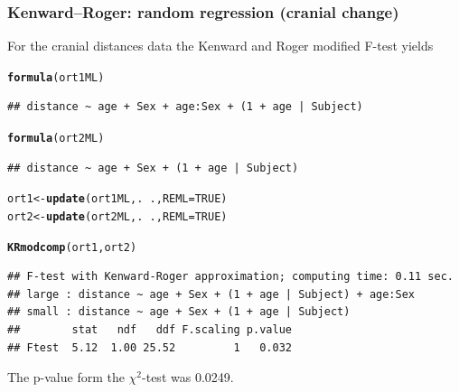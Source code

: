 \documentclass[compress]{beamer}\usepackage[]{graphicx}\usepackage[]{color}
\makeatletter
\newcommand{\hlnum}[1]{\textcolor[rgb]{0.686,0.059,0.569}{#1}}%
\newcommand{\hlopt}[1]{\textcolor[rgb]{0,0,0}{#1}}%
\newcommand{\hlstd}[1]{\textcolor[rgb]{0.345,0.345,0.345}{#1}}%
\newcommand{\hlkwb}[1]{\textcolor[rgb]{0.69,0.353,0.396}{#1}}%
\newcommand{\hlkwc}[1]{\textcolor[rgb]{0.333,0.667,0.333}{#1}}%
\newcommand{\hlkwd}[1]{\textcolor[rgb]{0.737,0.353,0.396}{\textbf{#1}}}%
\newenvironment{kframe}{%
 \def\at@end@of@kframe{}%
 \ifinner\ifhmode%
  \def\at@end@of@kframe{\end{minipage}}%
  \begin{minipage}{\columnwidth}%
 \fi\fi%
 \def\FrameCommand##1{\hskip\@totalleftmargin \hskip-\fboxsep
 \colorbox{shadecolor}{##1}\hskip-\fboxsep
     \hskip-\linewidth \hskip-\@totalleftmargin \hskip\columnwidth}%
 \MakeFramed {\advance\hsize-\width
   \@totalleftmargin\z@ \linewidth\hsize
   \@setminipage}}%
 {\par\unskip\endMakeFramed%
 \at@end@of@kframe}
\newenvironment{knitrout}{}{} %
\newenvironment{sframe}
{\begin{frame} [containsverbatim] }
  {\end{frame}}
\makeatother
\begin{document}
\begin{sframe}
  \frametitle{Kenward--Roger:  random regression (cranial change)}
For the cranial distances  data the
Kenward and Roger modified F-test yields
\begin{knitrout}\tiny
{}\color{fgcolor}\begin{kframe}
\begin{alltt}
\hlkwd{formula}\hlstd{(ort1ML)}
\end{alltt}
\begin{verbatim}
## distance ~ age + Sex + age:Sex + (1 + age | Subject)
\end{verbatim}
\begin{alltt}
\hlkwd{formula}\hlstd{(ort2ML)}
\end{alltt}
\begin{verbatim}
## distance ~ age + Sex + (1 + age | Subject)
\end{verbatim}
\begin{alltt}
\hlstd{ort1}\hlkwb{<-} \hlkwd{update}\hlstd{(ort1ML, .}\hlopt{~}\hlstd{.,} \hlkwc{REML} \hlstd{=} \hlnum{TRUE}\hlstd{)}
\hlstd{ort2}\hlkwb{<-} \hlkwd{update}\hlstd{(ort2ML, .}\hlopt{~}\hlstd{.,} \hlkwc{REML} \hlstd{=} \hlnum{TRUE}\hlstd{)}
\end{alltt}
\end{kframe}
\end{knitrout}
\end{sframe}

\begin{sframe}
\begin{knitrout}\tiny
{}\color{fgcolor}\begin{kframe}
\begin{alltt}
\hlkwd{KRmodcomp}\hlstd{(ort1, ort2)}
\end{alltt}
\begin{verbatim}
## F-test with Kenward-Roger approximation; computing time: 0.11 sec.
## large : distance ~ age + Sex + (1 + age | Subject) + age:Sex
## small : distance ~ age + Sex + (1 + age | Subject)
##        stat   ndf   ddf F.scaling p.value
## Ftest  5.12  1.00 25.52         1   0.032
\end{verbatim}
\end{kframe}
\end{knitrout}
The p-value form the  $\chi^2$-test was 0.0249.

\end{sframe}
\end{document}
